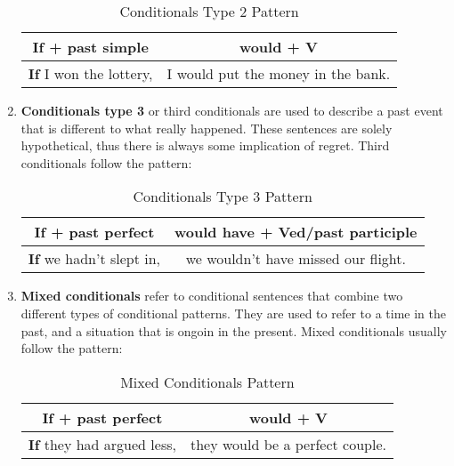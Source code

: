 \documentclass[hidelinks,10pt,a4paper]{article}
\begin{document}
\begin{enumerate}[label=(\alph*)]
		\begin{table}[h]
		\begin{center}
		\begin{tabular}{|c|c|}
			\hline
			\textbf{If + past simple} & \textbf{would + V} \\ \hline
			\textbf{If} I won the lottery, & I would put the money in the bank. \\ \hline
		\end{tabular}
		\end{center}
		\caption{Conditionals Type 2 Pattern} \label{tab:ct2}
		\end{table}

	\item \textbf{Conditionals type 3} or third conditionals are used to describe a past event that is different to what really happened. These sentences are solely hypothetical, thus there is always some implication of regret. Third conditionals follow the pattern:
		\begin{table}[h!]
		\begin{center}
		\begin{tabular}{|c|c|}
			\hline
			\textbf{If + past perfect} & \textbf{would have + Ved/past participle} \\ \hline
			\textbf{If} we hadn't slept in, & we wouldn't have missed our flight. \\ \hline
		\end{tabular}
		\end{center}
		\caption{Conditionals Type 3 Pattern} \label{tab:ct3}
		\end{table}
	\item \textbf{Mixed conditionals} refer to conditional sentences that combine two different types of conditional patterns. They are used to refer to a time in the past, and a situation that is ongoin in the present. Mixed conditionals usually follow the pattern:
		\begin{table}[h!]
		\begin{center}
		\begin{tabular}{|c|c|}
			\hline
			\textbf{If + past perfect} & \textbf{would + V} \\ \hline
			\textbf{If} they had argued less, & they would be a perfect couple. \\ \hline
		\end{tabular}
		\end{center}
		\caption{Mixed Conditionals Pattern} \label{tab:mi}
		\end{table}

\end{enumerate}
\end{document}
